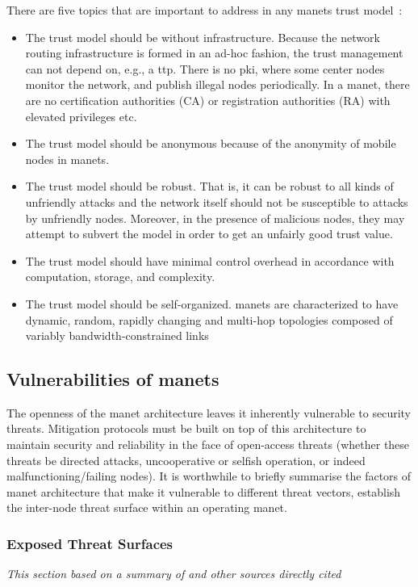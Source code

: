 There are five topics that are important to address in any \glspl{manet} trust model~\cite{Kamvar2003}:
%
\begin{itemize}
  \item The trust model should be without infrastructure.
    Because the network routing infrastructure is formed in an ad-hoc fashion, the trust management can not depend on, e.g., a \acrfull{ttp}.
    There is no \gls{pki}, where some center nodes monitor the network, and publish illegal nodes periodically.
    In a \gls{manet}, there are no certification authorities (CA) or registration authorities (RA) with elevated privileges etc.
  \item The trust model should be anonymous because of the anonymity of mobile nodes in \glspl{manet}. %
  \item The trust model should be robust.
    That is, it can be robust to all kinds of unfriendly attacks and the network itself should not be susceptible to attacks by unfriendly nodes.
    Moreover, in the presence of malicious nodes, they may attempt to subvert the model in order to get an unfairly good trust value.
  \item The trust model should have minimal control overhead in accordance with computation, storage, and complexity.
  \item The trust model should be self-organized.
    \glspl{manet} are characterized to have dynamic, random, rapidly changing and multi-hop topologies composed of variably bandwidth-constrained links
\end{itemize}
%

\subsection{Vulnerabilities of \glspl{manet}}

The openness of the \gls{manet} architecture leaves it inherently vulnerable to security threats. 
Mitigation protocols must be built on top of this architecture to maintain security and reliability in the face of open-access threats (whether these threats be directed attacks, uncooperative or selfish operation, or indeed malfunctioning/failing nodes).
It is worthwhile to briefly summarise the factors of \gls{manet} architecture that make it vulnerable to different threat vectors, establish the inter-node threat surface within an operating \gls{manet}.

\subsubsection{Exposed Threat Surfaces}
\emph{This section based on a summary of \citet{csen2010security} and other sources directly cited}


